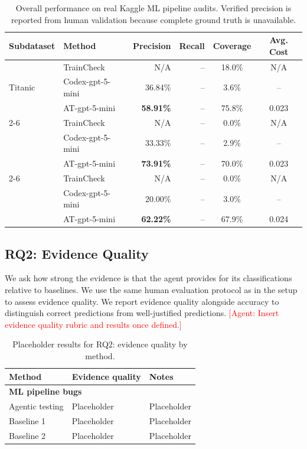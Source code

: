 \documentclass[11pt]{article}
\newcommand{\agent}[1]{\textcolor{red}{[Agent: #1]}}
\begin{document}
\begin{table}[t]
  \centering
  \caption{Overall performance on real Kaggle ML pipeline audits. Verified precision is reported from human validation because complete ground truth is unavailable.}
  \label{tab:rq1}
  \begin{tabular}{llrrcc}
    \toprule
    Subdataset & Method & Precision & Recall & Coverage & Avg. Cost \\
    \midrule
    \multirow{3}{*}{Titanic} & TrainCheck & N/A & -- & 18.0\% & N/A \\
     & Codex-gpt-5-mini & 36.84\% & -- & 3.6\% & -- \\
     & AT-gpt-5-mini & \textbf{58.91\%} & -- & 75.8\% & 0.023 \\
     \cmidrule(lr){2-6}
    \multirow{3}{*}{NLP} & TrainCheck & N/A & -- & 0.0\% & N/A \\
     & Codex-gpt-5-mini & 33.33\% & -- & 2.9\% & -- \\
     & AT-gpt-5-mini & \textbf{73.91\%} & -- & 70.0\% & 0.023 \\
     \cmidrule(lr){2-6}
    \multirow{3}{*}{Diabetic} & TrainCheck & N/A & -- & 0.0\% & N/A \\
     & Codex-gpt-5-mini & 20.00\% & -- & 3.0\% & -- \\
     & AT-gpt-5-mini & \textbf{62.22\%} & -- & 67.9\% & 0.024 \\
    \bottomrule
  \end{tabular}
\end{table}

\subsection{RQ2: Evidence Quality}
We ask how strong the evidence is that the agent provides for its classifications relative to baselines.
We use the same human evaluation protocol as in the setup to assess evidence quality.
We report evidence quality alongside accuracy to distinguish correct predictions from well-justified predictions.
\agent{Insert evidence quality rubric and results once defined.}

\begin{table}[t]
  \centering
  \caption{Placeholder results for RQ2: evidence quality by method.}
  \label{tab:rq2}
  \begin{tabular}{lll}
    \toprule
    Method & Evidence quality & Notes \\
    \midrule
    \multicolumn{3}{l}{\textbf{ML pipeline bugs}} \\
    Agentic testing & Placeholder & Placeholder \\
    Baseline 1 & Placeholder & Placeholder \\
    Baseline 2 & Placeholder & Placeholder \\
    \bottomrule
  \end{tabular}
\end{table}
\end{document}
